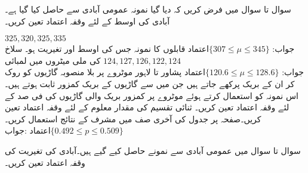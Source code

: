 سوال  تا سوال  میں فرض کریں کہ دیا گیا نمونہ  عمومی آبادی سے حاصل کیا گیا ہے۔آبادی کی اوسط  کے لئے  وقفہ اعتماد تعین کریں۔

 \quad
$325,320,325,335$\\
جواب:\quad
$\text{اعتماد} \{307\le \mu\le 345\}$
\quad
{} قابلوں کا نمونہ جس کی اوسط  اور تغیریت  ہو۔
\quad
سلاخ کی ملی میٹروں میں لمبائی
$124, 127,126,122,124$\\
جواب:\quad
$\text{اعتماد} \{120.6\le \mu\le 128.6\}$
\quad
پشاور تا لاہور موٹروے پر بلا منصوبہ  گاڑیوں کو روک کر ان کے بریک پرکھے جاتے ہیں جن میں سے  گاڑیوں کے بریک کمزور ثابت ہوتے ہیں۔اس نمونہ کو استعمال کرتے ہوئے موٹروے پر کمزور بریک والی گاڑیوں کی فی صد  کے لئے  وقفہ اعتماد تعین کریں۔
\quad
ثنائی تقسیم کی مقدار معلوم  کے لئے  وقفہ اعتماد تعین کریں۔صفحہ  پر جدول  کی آخری صف میں  مشرف کے نتائج استعمال کریں۔\\
جواب:\quad
$\text{اعتماد}  \{ 0.492\le p \le 0.509\}$

سوال  تا سوال  میں عمومی آبادی سے نمونے حاصل کیے گیے ہیں۔آبادی کی تغیریت  کی  وقفہ اعتماد تعین کریں۔

